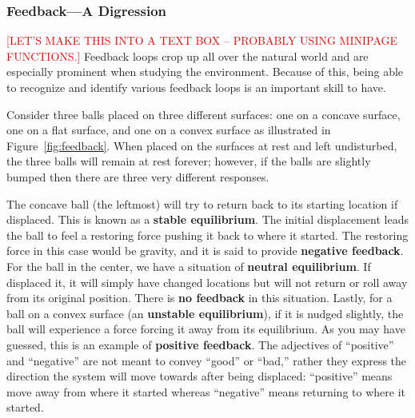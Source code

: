 
\subsubsection{Feedback---A Digression} %
		\textcolor{red}{[LET'S MAKE THIS INTO A TEXT BOX -- PROBABLY USING MINIPAGE FUNCTIONS.]}
    \label{ssub:feedback}
    Feedback loops crop up all over the natural world and are especially prominent when studying the environment. Because of this, being able to recognize and identify various feedback loops is an important skill to have.
    
    Consider three balls placed on three different surfaces: one on a concave surface, one on a flat surface, and one on a convex surface as illustrated in Figure~\ref{fig:feedback}. When placed on the surfaces at rest and left undisturbed, the three balls will remain at rest forever; however, if the balls are slightly bumped then there are three very different responses. 

    The concave ball (the leftmost) will try to return back to its starting location if displaced. This is known as a \textbf{stable equilibrium}. The initial displacement leads the ball to feel a restoring force pushing it back to where it started. The restoring force in this case would be gravity, and it is said to provide \textbf{negative feedback}. For the ball in the center, we have a situation of \textbf{neutral equilibrium}. If displaced it, it will simply have changed locations but will not return or roll away from its original position. There is \textbf{no feedback} in this situation. Lastly, for a ball on a convex surface (an \textbf{unstable equilibrium}), if it is nudged slightly, the ball will experience a force forcing it away from its equilibrium. As you may have guessed, this is an example of \textbf{positive feedback}. The adjectives of ``positive'' and ``negative'' are not meant to convey ``good'' or ``bad,'' rather they express the direction the system will move towards after being displaced: ``positive'' means move away from where it started whereas ``negative'' means returning to where it started.

